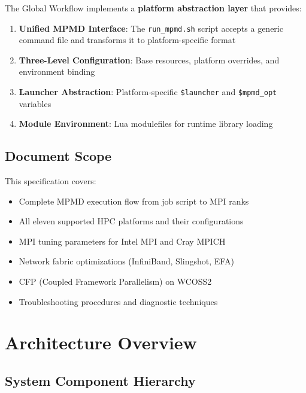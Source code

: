 \documentclass[11pt,a4paper,twoside]{article}
\begin{document}
The Global Workflow implements a \textbf{platform abstraction layer} that provides:

\begin{enumerate}
    \item \textbf{Unified MPMD Interface}: The \texttt{run\_mpmd.sh} script accepts a generic command file and transforms it to platform-specific format
    \item \textbf{Three-Level Configuration}: Base resources, platform overrides, and environment binding
    \item \textbf{Launcher Abstraction}: Platform-specific \texttt{\$launcher} and \texttt{\$mpmd\_opt} variables
    \item \textbf{Module Environment}: Lua modulefiles for runtime library loading
\end{enumerate}

\subsection{Document Scope}

This specification covers:
\begin{itemize}[noitemsep]
    \item Complete MPMD execution flow from job script to MPI ranks
    \item All eleven supported HPC platforms and their configurations
    \item MPI tuning parameters for Intel MPI and Cray MPICH
    \item Network fabric optimizations (InfiniBand, Slingshot, EFA)
    \item CFP (Coupled Framework Parallelism) on WCOSS2
    \item Troubleshooting procedures and diagnostic techniques
\end{itemize}

\section{Architecture Overview}
\label{sec:architecture}

\subsection{System Component Hierarchy}
\end{document}
